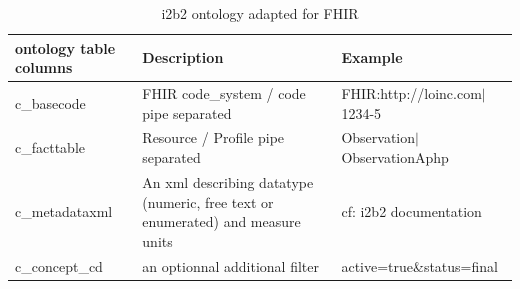 \documentclass{amia}
\begin{document}
\begin{table}[h]
\centering
	\begin{tabular}{|p{2cm}|p{6cm}|p{5cm}|}
  \hline
		\textbf{ontology table columns}    & \textbf{Description} & \textbf{Example} \\ \hline
		c\_basecode  &  FHIR code\_system / code pipe separated  & FHIR:http://loinc.com$|$1234-5  \\ \hline
		c\_facttable  &  Resource / Profile pipe separated  & Observation$|$ObservationAphp  \\ \hline
		c\_metadataxml  &  An xml describing datatype (numeric, free text or enumerated) and measure units  & cf: i2b2 documentation   \\ \hline
		c\_concept\_cd  &  an optionnal additional filter  & active=true\&status=final  \\ \hline
  \end{tabular}
	\label{tab1}
\caption{i2b2 ontology adapted for FHIR}
\end{table}
\end{document}

